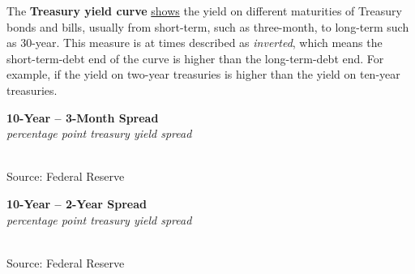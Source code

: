 \documentclass{report}
\makeatletter
\newcommand{\tbllink}[1]{\href{https://raw.githubusercontent.com/bdecon/US-chartbook/master/chartbook/data/#1}{\faTable}}
\newcommand*\short[1]{\expandafter\@gobbletwo\number\numexpr#1\relax}
\newcommand{\dateaxisticks}{
		date coordinates in=x, axis line style={draw=none},
		xmax={2020-05-10},
		max space between ticks=40,	    
		xtick={{1990-01-01}, {1992-01-01}, {1994-01-01}, 
			{1996-01-01}, {1998-01-01}, {2000-01-01}, 
			{2002-01-01}, {2004-01-01}, {2006-01-01},
			{2008-01-01}, {2010-01-01}, {2012-01-01}, {2014-01-01},
		    {2016-01-01}, {2018-01-01}, {2020-01-01}},
		minor xtick={{1989-01-01}, {1991-01-01}, {1993-01-01},
			{1995-01-01}, {1997-01-01}, {1999-01-01}, 
			{2001-01-01}, {2003-01-01}, {2005-01-01}, {2007-01-01},
		    {2009-01-01}, {2011-01-01}, {2013-01-01}, {2015-01-01},
		    {2017-01-01}, {2019-01-01}},
		enlarge y limits={0.06}, enlarge x limits={0.01},
		}
\newcommand{\bbar}[2]{extra #1 ticks = {{#2}}, extra #1 tick labels = ,
		extra #1 tick style = {grid=major, grid style={thick, black!25}},}
\newcommand{\thinline}[4]{\addplot[no markers, color=#1] 
		table [x=#2, y=#3, col sep=comma] {#4};	}
\makeatother
\begin{document}
{{{{{{{{{\begin{minipage}{0.76\textwidth}
\small The \textbf{Treasury yield curve} \href{https://www.treasury.gov/resource-center/data-chart-center/interest-rates/Pages/TextView.aspx?data=yield}{shows} the yield on different maturities of Treasury bonds and bills, usually from short-term, such as three-month, to long-term such as 30-year. This measure is at times described as \textit{inverted}, which means the short-term-debt end of the curve is higher than the long-term-debt end. For example, if the yield on two-year treasuries is higher than the yield on ten-year treasuries. \\




\end{minipage}

\vspace{3mm}


\begin{minipage}{0.39\textwidth}

\noindent \normalsize \textbf{10-Year -- 3-Month Spread}\\
\footnotesize{\textit{percentage point treasury yield spread}}\\
\noindent \hspace*{-2mm} \\
\footnotesize{Source: Federal Reserve} \hspace{20mm} \tbllink{spread.csv} 
\end{minipage}
\hspace{2mm}
\begin{minipage}{0.39\textwidth}
\noindent \normalsize \textbf{10-Year -- 2-Year Spread}\\
\footnotesize{\textit{percentage point treasury yield spread}}\\
\noindent \hspace*{-2mm} \\
\footnotesize{Source: Federal Reserve} \hspace{20mm} \tbllink{spread.csv} 
\end{minipage}

}}}}}}}}}
\end{document}
